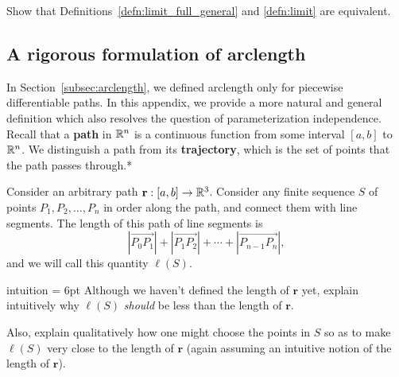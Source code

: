 \documentclass{watsonbook}
\begin{document}


\begin{exercise}{}{}
  Show that Definitions~\ref{defn:limit_full_general} and
  \ref{defn:limit} are equivalent.
\end{exercise} \enlargethispage{1cm}

\subsection{A rigorous formulation of arclength}
\label{sec:arclengthappendix}

In Section~\ref{subsec:arclength}, we defined arclength only for
piecewise differentiable paths. In this appendix, we provide a more
natural and general definition which also resolves the question of
parameterization independence. Recall that a \textbf{path} in $\mathbb{R}^n$
is a continuous function from some interval $[a,b]$ to $\mathbb{R}^n$. We
distinguish a path from its \textbf{trajectory}, which is the set of
points that the path passes through.* 

Consider an arbitrary path $\mathbf{r}:[a,b] \to \mathbb{R}^3$. Consider any
finite sequence $S$ of points $P_1, P_2, \ldots, P_n$ in order along
the path, and connect them with line segments. The length of this path
of line segments is
\[
  |\overrightarrow{P_0P_1}| +
  |\overrightarrow{P_1P_2}| + \cdots +
  |\overrightarrow{P_{n-1}P_n}|, 
\]
and we will call this quantity $\ell(S)$.

\begin{exercise}{}{intuition} \parskip = 6pt 
  Although we haven't defined the length of $\mathbf{r}$ yet, explain
  intuitively why $\ell(S)$ \textit{should} be less than the length of
  $\mathbf{r}$.

  Also, explain qualitatively how one might choose the points in $S$
  so as to make $\ell(S)$ very close to the length of $\mathbf{r}$
  (again assuming an intuitive notion of the length of $\mathbf{r}$).
\end{exercise}
\end{document}
